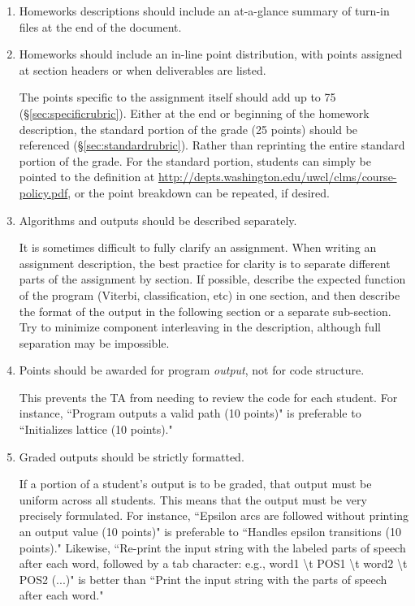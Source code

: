 \documentclass[12pt]{article}
\begin{document}
\begin{enumerate}

\item {Homeworks descriptions should include an at-a-glance summary of turn-in files at the end of the document. }

\item {Homeworks should include an in-line point distribution, with points assigned at section headers or when deliverables are listed.

The points specific to the assignment itself should add up to 75 (\S\ref{sec:specificrubric}). Either at the end or beginning of the homework description, the standard portion of the grade (25 points) should be referenced (\S\ref{sec:standardrubric}). Rather than reprinting the entire standard portion of the grade. For the standard portion, students can simply be pointed to the definition at \url{http://depts.washington.edu/uwcl/clms/course-policy.pdf}, or the point breakdown can be repeated, if desired.} %

\item {Algorithms and outputs should be described separately. 

It is sometimes difficult to fully clarify an assignment. When writing an assignment description, the best practice for clarity is to separate different parts of the assignment by section. If possible, describe the expected function of the program (Viterbi, classification, etc) in one section, and then describe the format of the output in the following section or a separate sub-section. Try to minimize component interleaving in the description, although full separation may be impossible.}

\item {Points should be awarded for program \textit{output}, not for code structure.

This prevents the TA from needing to review the code for each student. For instance, ``Program outputs a valid path (10 points)" is preferable to ``Initializes lattice (10 points)."}
 
\item {Graded outputs should be strictly formatted.
  
  If a portion of a student's output is to be graded, that output must be uniform across all students. This means that the output must be very precisely formulated. For instance, ``Epsilon arcs are followed without printing an output value (10 points)" is preferable to ``Handles epsilon transitions (10 points)." Likewise, ``Re-print the input string with the labeled parts of speech after each word, followed by a tab character: e.g., word1 {\textbackslash}t POS1 {\textbackslash}t word2 {\textbackslash}t POS2 (...)" is better than ``Print the input string with the parts of speech after each word."
  
}
\end{enumerate}
\end{document}
